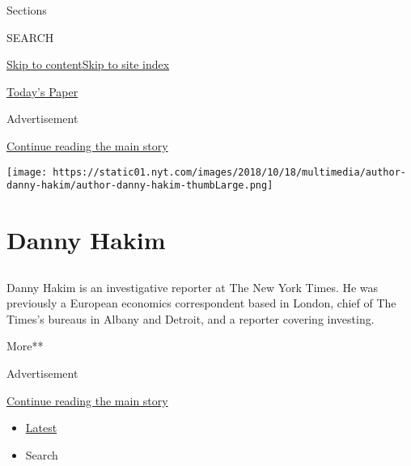 Sections

SEARCH

\protect\hyperlink{site-content}{Skip to
content}\protect\hyperlink{site-index}{Skip to site index}

\href{https://myaccount.nytimes.com/auth/login?response_type=cookie\&client_id=vi}{}

\href{https://www.nytimes.com/section/todayspaper}{Today's Paper}

Advertisement

\protect\hyperlink{after-top}{Continue reading the main story}

\texttt{[image: https://static01.nyt.com/images/2018/10/18/multimedia/author-danny-hakim/author-danny-hakim-thumbLarge.png]}

\hypertarget{danny-hakim}{%
\section{Danny Hakim}\label{danny-hakim}}

\subsection{}

Danny Hakim is an investigative reporter at The New York Times. He was
previously a European economics correspondent based in London, chief of
The Times's bureaus in Albany and Detroit, and a reporter covering
investing.

More**

Advertisement

\protect\hyperlink{after-mid1}{Continue reading the main story}

\begin{itemize}
\tightlist
\item
  \protect\hyperlink{stream-panel}{Latest}
\item
  Search
\end{itemize}

